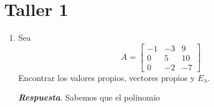 \documentclass{report}
\begin{document}

    \pagebreak
    \section*{Taller 1}

    \begin{enumerate}
        \item Sea
        $$A = \begin{bmatrix}
            -1 & -3 & 9\\
            0 & 5 & 10\\
            0 & -2 & -7
        \end{bmatrix}$$
        Encontrar los valores propios, vectores propios y $E_\lambda$.

        \textit{\textbf{Respuesta}}. Sabemos que el polinomio
    \end{enumerate}
\end{document}
